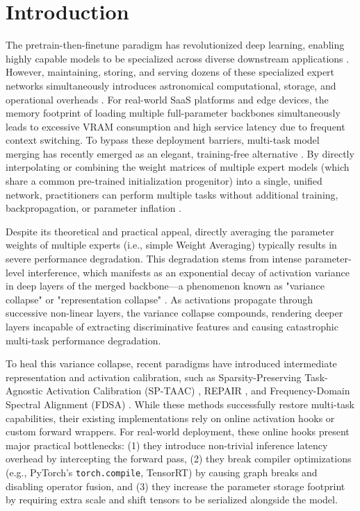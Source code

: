\documentclass{article}
\theoremstyle{plain}
\theoremstyle{definition}
\theoremstyle{remark}
\begin{document}
\section{Introduction}
\label{sec:intro}
The pretrain-then-finetune paradigm has revolutionized deep learning, enabling highly capable models to be specialized across diverse downstream applications \cite{vaswani2017attention, caruana1997multitask, donahue2014decaf}. However, maintaining, storing, and serving dozens of these specialized expert networks simultaneously introduces astronomical computational, storage, and operational overheads \cite{ruder2017overview, collobert2008unified, long2015dan}. For real-world SaaS platforms and edge devices, the memory footprint of loading multiple full-parameter backbones simultaneously leads to excessive VRAM consumption and high service latency due to frequent context switching. To bypass these deployment barriers, multi-task model merging has recently emerged as an elegant, training-free alternative \cite{wortsman2022modelsoups, choshen2022fusing, tang2023fusion}. By directly interpolating or combining the weight matrices of multiple expert models (which share a common pre-trained initialization progenitor) into a single, unified network, practitioners can perform multiple tasks without additional training, backpropagation, or parameter inflation \cite{ilharco2022editing, jin2022dataless, matena2022merging}.

Despite its theoretical and practical appeal, directly averaging the parameter weights of multiple experts (i.e., simple Weight Averaging) typically results in severe performance degradation. This degradation stems from intense parameter-level interference, which manifests as an exponential decay of activation variance in deep layers of the merged backbone—a phenomenon known as "variance collapse" or "representation collapse" \cite{jordan2023repair, sengupta2020rethinking, mu2024representation}. As activations propagate through successive non-linear layers, the variance collapse compounds, rendering deeper layers incapable of extracting discriminative features and causing catastrophic multi-task performance degradation.

To heal this variance collapse, recent paradigms have introduced intermediate representation and activation calibration, such as Sparsity-Preserving Task-Agnostic Activation Calibration (SP-TAAC) \cite{taac2023}, REPAIR \cite{jordan2023repair}, and Frequency-Domain Spectral Alignment (FDSA) \cite{fdsa2025}. While these methods successfully restore multi-task capabilities, their existing implementations rely on online activation hooks or custom forward wrappers. For real-world deployment, these online hooks present major practical bottlenecks: (1) they introduce non-trivial inference latency overhead by intercepting the forward pass, (2) they break compiler optimizations (e.g., PyTorch's \texttt{torch.compile}, TensorRT) by causing graph breaks and disabling operator fusion, and (3) they increase the parameter storage footprint by requiring extra scale and shift tensors to be serialized alongside the model.
\end{document}
